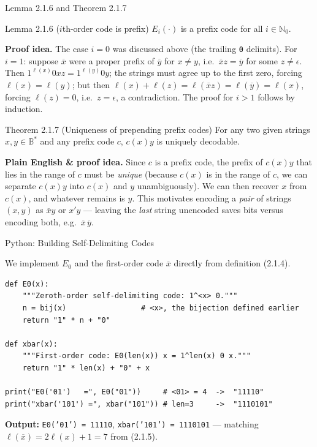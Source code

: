\documentclass[aspectratio=169,10pt]{beamer}
\newcommand{\Bs}{\mathbb{B}^{*}}
\newcommand{\len}{\ell}
\begin{document}
\begin{frame}{Lemma 2.1.6 and Theorem 2.1.7}

\begin{block}{Lemma 2.1.6 ($i$th-order code is prefix)}
$E_i(\cdot)$ is a prefix code for all $i\in\mathbb{N}_0$.
\end{block}

\textbf{Proof idea.} The case $i=0$ was discussed above (the trailing
\texttt{0} delimits). For $i=1$: suppose $\overline{x}$ were a proper
prefix of $\overline{y}$ for $x\neq y$, i.e.\ $\overline{x}z=\overline{y}$
for some $z\neq\epsilon$. Then $1^{\len(x)}0xz=1^{\len(y)}0y$; the strings
must agree up to the first zero, forcing $\len(x)=\len(y)$; but then
$\len(x)+\len(z)=\len(\overline{x}z)=\len(\overline{y})=\len(x)$, forcing
$\len(z)=0$, i.e.\ $z=\epsilon$, a contradiction. The proof for $i>1$
follows by induction.

\begin{block}{Theorem 2.1.7 (Uniqueness of prepending prefix codes)}
For any two given strings $x,y\in\Bs$ and any prefix code $c$, $c(x)y$ is
uniquely decodable.
\end{block}

\textbf{Plain English \& proof idea.} Since $c$ is a prefix code, the
prefix of $c(x)y$ that lies in the range of $c$ must be \emph{unique}
(because $c(x)$ is in the range of $c$, we can separate $c(x)y$ into
$c(x)$ and $y$ unambiguously). We can then recover $x$ from $c(x)$, and
whatever remains is $y$. This motivates encoding a \emph{pair} of strings
$(x,y)$ as $\overline{x}y$ or $x'y$ --- leaving the \emph{last} string
unencoded saves bits versus encoding both, e.g.\ $\overline{x}\,\overline{y}$.
\end{frame}

\begin{frame}[fragile]{Python: Building Self-Delimiting Codes}

We implement $E_0$ and the first-order code $\overline{x}$ directly from
definition (2.1.4).

\begin{lstlisting}
def E0(x):
    """Zeroth-order self-delimiting code: 1^<x> 0."""
    n = bij(x)                 # <x>, the bijection defined earlier
    return "1" * n + "0"

def xbar(x):
    """First-order code: E0(len(x)) x = 1^len(x) 0 x."""
    return "1" * len(x) + "0" + x

print("E0('01')   =", E0("01"))     # <01> = 4  ->  "11110"
print("xbar('101') =", xbar("101")) # len=3     ->  "1110101"
\end{lstlisting}

\textbf{Output:} \texttt{E0('01') = 11110}, \texttt{xbar('101') = 1110101}
--- matching $\len(\overline{x})=2\len(x)+1=7$ from (2.1.5).
\end{frame}
\end{document}
